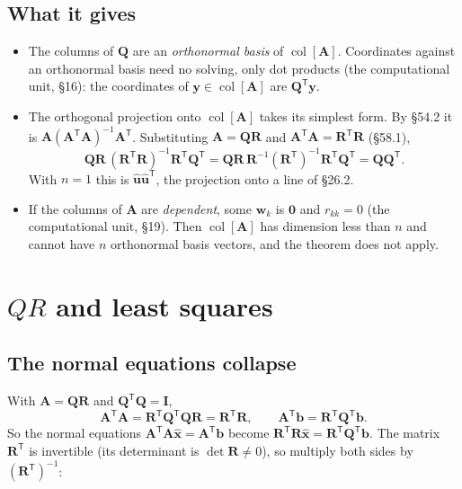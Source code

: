 \documentclass[11pt]{article}
\theoremstyle{plain}
\theoremstyle{definition}
\theoremstyle{remark}
\newcommand{\vc}[1]{\mathbf{#1}}
\newcommand{\mt}[1]{\mathbf{#1}}
\newcommand{\T}{^{\mathsf{T}}}
\newcommand{\colsp}[1]{\operatorname{col}[#1]}
\newcommand{\xh}{\hat{\vc{x}}}
\begin{document}
\subsection{What it gives}
\begin{itemize}[leftmargin=1.4em,itemsep=4pt]
  \item The columns of $\mt{Q}$ are an \emph{orthonormal basis} of $\colsp{\mt{A}}$.
        Coordinates against an orthonormal basis need no solving, only dot
        products (the computational unit, \S16): the coordinates of
        $\vc{y}\in\colsp{\mt{A}}$ are $\mt{Q}\T\vc{y}$.
  \item The orthogonal projection onto $\colsp{\mt{A}}$ takes its simplest form.
        By \S54.2 it is $\mt{A}(\mt{A}\T\mt{A})^{-1}\mt{A}\T$. Substituting
        $\mt{A}=\mt{Q}\mt{R}$ and $\mt{A}\T\mt{A}=\mt{R}\T\mt{R}$ (\S58.1),
        \[
          \mt{Q}\mt{R}\,(\mt{R}\T\mt{R})^{-1}\mt{R}\T\mt{Q}\T
          =\mt{Q}\mt{R}\,\mt{R}^{-1}(\mt{R}\T)^{-1}\mt{R}\T\mt{Q}\T
          =\mt{Q}\mt{Q}\T .
        \]
        With $n=1$ this is $\hat{\vc{u}}\hat{\vc{u}}\T$, the projection onto a
        line of \S26.2.
  \item If the columns of $\mt{A}$ are \emph{dependent}, some $\vc{w}_k$ is
        $\vc{0}$ and $r_{kk}=0$ (the computational unit, \S19). Then
        $\colsp{\mt{A}}$ has dimension less than $n$ and cannot have $n$
        orthonormal basis vectors, and the theorem does not apply.
\end{itemize}

\section{\texorpdfstring{$QR$}{QR} and least squares}

\subsection{The normal equations collapse}
With $\mt{A}=\mt{Q}\mt{R}$ and $\mt{Q}\T\mt{Q}=\mt{I}$,
\[
  \mt{A}\T\mt{A}=\mt{R}\T\mt{Q}\T\mt{Q}\mt{R}=\mt{R}\T\mt{R},
  \qquad
  \mt{A}\T\vc{b}=\mt{R}\T\mt{Q}\T\vc{b}.
\]
So the normal equations $\mt{A}\T\mt{A}\xh=\mt{A}\T\vc{b}$ become
$\mt{R}\T\mt{R}\xh=\mt{R}\T\mt{Q}\T\vc{b}$. The matrix $\mt{R}\T$ is invertible
(its determinant is $\det\mt{R}\neq0$), so multiply both sides by
$(\mt{R}\T)^{-1}$:
\end{document}
